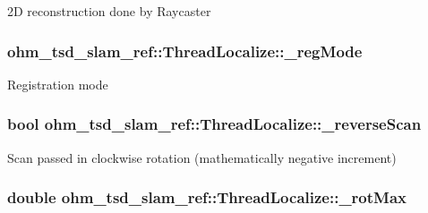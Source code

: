 2\-D reconstruction done by Raycaster \hypertarget{classohm__tsd__slam__ref_1_1ThreadLocalize_ace3a4195d80299e3eb37be6c3a06a218}{
\subsubsection[{\-\_\-reg\-Mode}]{ ohm\-\_\-tsd\-\_\-slam\-\_\-ref\-::\-Thread\-Localize\-::\-\_\-reg\-Mode\hspace{0.3cm}{\ttfamily [private]}}}\label{classohm__tsd__slam__ref_1_1ThreadLocalize_ace3a4195d80299e3eb37be6c3a06a218}
Registration mode \hypertarget{classohm__tsd__slam__ref_1_1ThreadLocalize_a176899f67fbf706a756853a8af968fd5}{
\subsubsection[{\-\_\-reverse\-Scan}]{\setlength{\rightskip}{0pt plus 5cm}bool ohm\-\_\-tsd\-\_\-slam\-\_\-ref\-::\-Thread\-Localize\-::\-\_\-reverse\-Scan\hspace{0.3cm}{\ttfamily [private]}}}\label{classohm__tsd__slam__ref_1_1ThreadLocalize_a176899f67fbf706a756853a8af968fd5}
Scan passed in clockwise rotation (mathematically negative increment) \hypertarget{classohm__tsd__slam__ref_1_1ThreadLocalize_a4eec8ac0c4da6cc90fe5dcc22cee2447}{
\subsubsection[{\-\_\-rot\-Max}]{\setlength{\rightskip}{0pt plus 5cm}double ohm\-\_\-tsd\-\_\-slam\-\_\-ref\-::\-Thread\-Localize\-::\-\_\-rot\-Max\hspace{0.3cm}{\ttfamily [private]}}}\label{classohm__tsd__slam__ref_1_1ThreadLocalize_a4eec8ac0c4da6cc90fe5dcc22cee2447}
